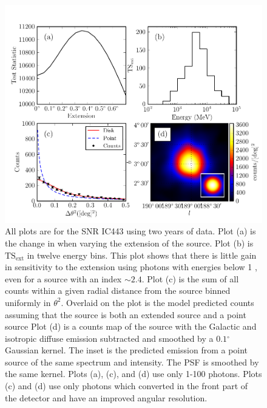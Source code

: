 \documentclass[12pt,preprint]{aastex}
\newcommand{\gev}{\text{GeV}\xspace}
\newcommand{\tsext}{{\ensuremath{\text{TS}_{\text{ext}}}}\xspace}
\newcommand{\ts}{\text{TS}\xspace}
\renewcommand{\deg}{\ensuremath{^\circ}\xspace}
\renewcommand{\approx}{\sim\!\xspace}
\begin{document}



\clearpage
\begin{figure}
  \begin{center}
    \includegraphics{ic443_plots/four_plots_ic443.pdf}
    \caption{
    All plots are for the SNR IC443 using two years of data.
    Plot (a) is the change in \ts when varying the
    extension of the source.  
    Plot (b) is \tsext in twelve energy bins. This plot shows that there is
    little gain in sensitivity to the extension using photons
    with energies below 1 \gev, even for a source with an index $\approx2.4$.
    Plot (c) is the sum of all counts within a given radial distance
    from the source binned uniformly in $\theta^2$. 
    Overlaid on the plot is the model predicted counts assuming that
    the source is both an extended source and a point source
    Plot (d) is a counts map of the source with the Galactic and
    isotropic diffuse emission subtracted and smoothed by a $0.1\deg$
    Gaussian kernel.  The inset is the predicted emission from a point
    source of the same spectrum and intensity.  The PSF is smoothed
    by the same kernel.  Plots (a), (c), and (d) use only 1-100 \gev photons. 
    Plots (c) and (d)
    use only photons which converted in the front
    part of the detector and have an improved angular resolution.
    }
    \label{four_plots_ic443}
  \end{center}
\end{figure}
\end{document}
